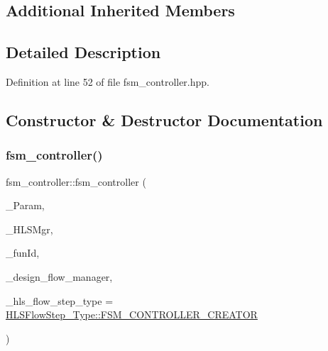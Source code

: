\subsection*{Additional Inherited Members}


\subsection{Detailed Description}


Definition at line 52 of file fsm\+\_\+controller.\+hpp.



\subsection{Constructor \& Destructor Documentation}
\mbox{\label{classfsm__controller_a3d9ecb2315c65086b2a52d4d0a30f2fc}} 
\subsubsection{\texorpdfstring{fsm\+\_\+controller()}{fsm\_controller()}}
{\footnotesize\ttfamily fsm\+\_\+controller\+::fsm\+\_\+controller (\begin{DoxyParamCaption}\item[{const \hyperlink{Parameter_8hpp_a37841774a6fcb479b597fdf8955eb4ea}{Parameter\+Const\+Ref}}]{\+\_\+\+Param,  }\item[{const \hyperlink{hls__manager_8hpp_acd3842b8589fe52c08fc0b2fcc813bfe}{H\+L\+S\+\_\+manager\+Ref}}]{\+\_\+\+H\+L\+S\+Mgr,  }\item[{unsigned int}]{\+\_\+fun\+Id,  }\item[{const Design\+Flow\+Manager\+Const\+Ref}]{\+\_\+design\+\_\+flow\+\_\+manager,  }\item[{const \hyperlink{hls__step_8hpp_ada16bc22905016180e26fc7e39537f8d}{H\+L\+S\+Flow\+Step\+\_\+\+Type}}]{\+\_\+hls\+\_\+flow\+\_\+step\+\_\+type = {\ttfamily \hyperlink{hls__step_8hpp_ada16bc22905016180e26fc7e39537f8dafc3ad5cbed1c2ed2a879677fc5567cd9}{H\+L\+S\+Flow\+Step\+\_\+\+Type\+::\+F\+S\+M\+\_\+\+C\+O\+N\+T\+R\+O\+L\+L\+E\+R\+\_\+\+C\+R\+E\+A\+T\+OR}} }\end{DoxyParamCaption})}



